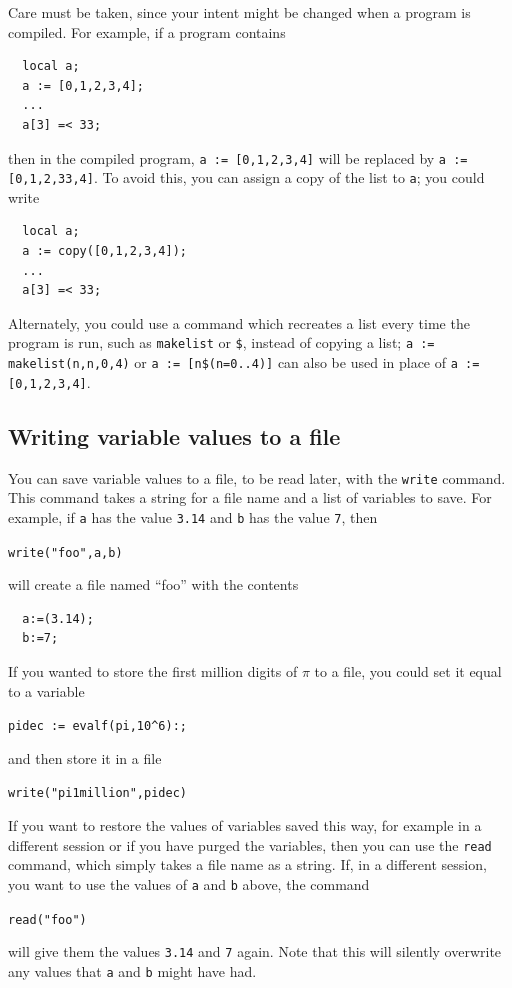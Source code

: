 \documentclass[a4paper,11pt]{book}
\begin{document}
Care must be taken, since your intent might be changed when a program
is compiled.  For example, if a program contains
\begin{verbatim}
  local a;
  a := [0,1,2,3,4];
  ...
  a[3] =< 33;
\end{verbatim}
then in the compiled program, \texttt{a := [0,1,2,3,4]} will be
replaced by \texttt{a := [0,1,2,33,4]}.  To avoid this, you can assign
a copy of the list to \texttt{a}; you could write
\begin{verbatim}
  local a;
  a := copy([0,1,2,3,4]);
  ...
  a[3] =< 33;
\end{verbatim}
Alternately, you could use a command which recreates a list every time
the program is run, such as \texttt{makelist} or
\texttt{\$}, instead of copying a list;  \texttt{a :=
makelist(n,n,0,4)} or \texttt{a := [n\$(n=0..4)]} can also be used in
place of \texttt{a := [0,1,2,3,4]}.

\subsection{Writing variable values to a file}

You can save variable values to a file, to be read later, with the
\texttt{write} command.  This command takes a string for a file name
and a list of variables to save.  For example, if \texttt{a} has the
value \texttt{3.14} and \texttt{b} has the value \texttt{7}, then
\begin{center}
  {\tt write("foo",a,b)}
\end{center}
will create a file named ``foo'' with the contents
\begin{verbatim}
  a:=(3.14);
  b:=7;
\end{verbatim}
If you wanted to store the first million digits of $\pi$ to a file,
you could set it equal to a variable
\begin{center}
  {\tt pidec := evalf(pi,10\^{}6):;}
\end{center}
and then store it in a file
\begin{center}
  {\tt write("pi1million",pidec)}
\end{center}

If you want to restore the values of variables saved this way, for
example in a different session or if you have purged the
variables, then you can use the \texttt{read} command, which simply
takes a file name as a string.  If, in a different session, you want
to use the values of \texttt{a} and \texttt{b} above, the command
\begin{center}
  {\tt read("foo")}
\end{center}
will give them the values \texttt{3.14} and \texttt{7} again.  Note
that this will silently overwrite any values that \texttt{a} and
\texttt{b} might have had.
\end{document}
